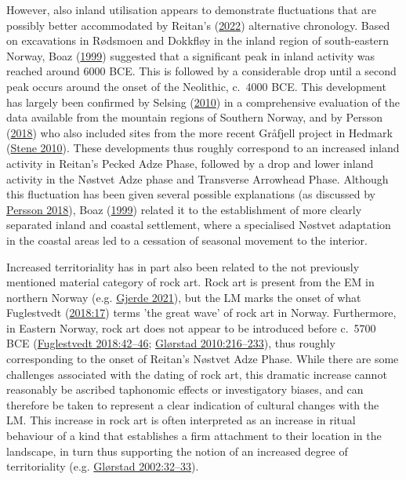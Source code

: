 \documentclass[
  12pt,
  a4paper,
  oneside]{book}
\begin{document}
However, also inland utilisation appears to demonstrate fluctuations that are possibly better accommodated by Reitan's (\protect\hyperlink{ref-reitan2022}{2022}) alternative chronology. Based on excavations in Rødsmoen and Dokkfløy in the inland region of south-eastern Norway, Boaz (\protect\hyperlink{ref-boaz1999}{1999}) suggested that a significant peak in inland activity was reached around 6000 BCE. This is followed by a considerable drop until a second peak occurs around the onset of the Neolithic, c.~4000 BCE. This development has largely been confirmed by Selsing (\protect\hyperlink{ref-selsing2010}{2010}) in a comprehensive evaluation of the data available from the mountain regions of Southern Norway, and by Persson (\protect\hyperlink{ref-persson2018}{2018}) who also included sites from the more recent Gråfjell project in Hedmark (\protect\hyperlink{ref-stene2010}{Stene 2010}). These developments thus roughly correspond to an increased inland activity in Reitan's Pecked Adze Phase, followed by a drop and lower inland activity in the Nøstvet Adze phase and Transverse Arrowhead Phase. Although this fluctuation has been given several possible explanations (as discussed by \protect\hyperlink{ref-persson2018}{Persson 2018}), Boaz (\protect\hyperlink{ref-boaz1999}{1999}) related it to the establishment of more clearly separated inland and coastal settlement, where a specialised Nøstvet adaptation in the coastal areas led to a cessation of seasonal movement to the interior.

Increased territoriality has in part also been related to the not previously mentioned material category of rock art. Rock art is present from the EM in northern Norway (e.g. \protect\hyperlink{ref-gjerde2021}{Gjerde 2021}), but the LM marks the onset of what Fuglestvedt (\protect\hyperlink{ref-fuglestvedt2018}{2018:17}) terms 'the great wave' of rock art in Norway. Furthermore, in Eastern Norway, rock art does not appear to be introduced before c.~5700 BCE (\protect\hyperlink{ref-fuglestvedt2018}{Fuglestvedt 2018:42--46}; \protect\hyperlink{ref-glorstad2010}{Glørstad 2010:216--233}), thus roughly corresponding to the onset of Reitan's Nøstvet Adze Phase. While there are some challenges associated with the dating of rock art, this dramatic increase cannot reasonably be ascribed taphonomic effects or investigatory biases, and can therefore be taken to represent a clear indication of cultural changes with the LM. This increase in rock art is often interpreted as an increase in ritual behaviour of a kind that establishes a firm attachment to their location in the landscape, in turn thus supporting the notion of an increased degree of territoriality (e.g. \protect\hyperlink{ref-glorstad2002}{Glørstad 2002:32--33}).
\end{document}
